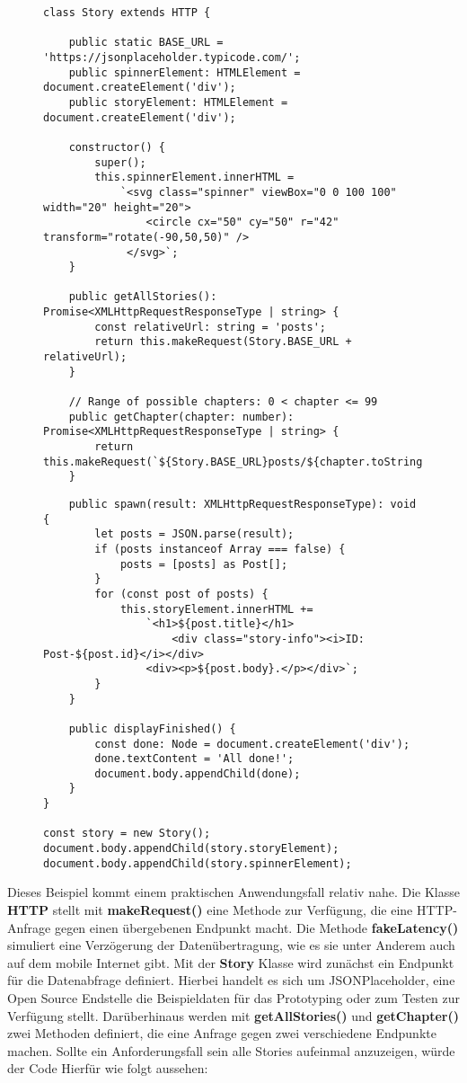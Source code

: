 \begin{figure}[H]
\begin{lstlisting}
class Story extends HTTP {

    public static BASE_URL = 'https://jsonplaceholder.typicode.com/';
    public spinnerElement: HTMLElement = document.createElement('div');
    public storyElement: HTMLElement = document.createElement('div');

    constructor() {
        super();
        this.spinnerElement.innerHTML =
            `<svg class="spinner" viewBox="0 0 100 100" width="20" height="20">
                <circle cx="50" cy="50" r="42" transform="rotate(-90,50,50)" />
             </svg>`;
    }

    public getAllStories(): Promise<XMLHttpRequestResponseType | string> {
        const relativeUrl: string = 'posts';
        return this.makeRequest(Story.BASE_URL + relativeUrl);
    }

    // Range of possible chapters: 0 < chapter <= 99
    public getChapter(chapter: number): Promise<XMLHttpRequestResponseType | string> {
        return this.makeRequest(`${Story.BASE_URL}posts/${chapter.toString()}`);
    }

\end{lstlisting}
\end{figure}
\begin{figure}[H]
\begin{lstlisting}
    public spawn(result: XMLHttpRequestResponseType): void {
        let posts = JSON.parse(result);
        if (posts instanceof Array === false) {
            posts = [posts] as Post[];
        }
        for (const post of posts) {
            this.storyElement.innerHTML +=
                `<h1>${post.title}</h1>
                    <div class="story-info"><i>ID: Post-${post.id}</i></div>
                <div><p>${post.body}.</p></div>`;
        }
    }

    public displayFinished() {
        const done: Node = document.createElement('div');
        done.textContent = 'All done!';
        document.body.appendChild(done);
    }
}

const story = new Story();
document.body.appendChild(story.storyElement);
document.body.appendChild(story.spinnerElement);
\end{lstlisting}
\end{figure}

\noindent
Dieses Beispiel kommt einem praktischen Anwendungsfall relativ nahe. Die Klasse \textbf{HTTP} stellt mit  \textbf{makeRequest()} eine Methode zur Verfügung, die eine HTTP-Anfrage gegen einen übergebenen Endpunkt macht. Die Methode \textbf{fakeLatency()} simuliert eine Verzögerung der Datenübertragung, wie es sie unter Anderem auch auf dem mobile Internet gibt. Mit der \textbf{Story} Klasse wird zunächst ein Endpunkt für die Datenabfrage definiert. Hierbei handelt es sich um JSONPlaceholder, eine Open Source Endstelle die Beispieldaten für das Prototyping oder zum Testen zur Verfügung stellt. Darüberhinaus werden mit \textbf{getAllStories()} und \textbf{getChapter()} zwei Methoden definiert, die eine Anfrage gegen zwei verschiedene Endpunkte machen.  Sollte ein Anforderungsfall sein alle Stories aufeinmal anzuzeigen, würde der Code Hierfür wie folgt aussehen:

